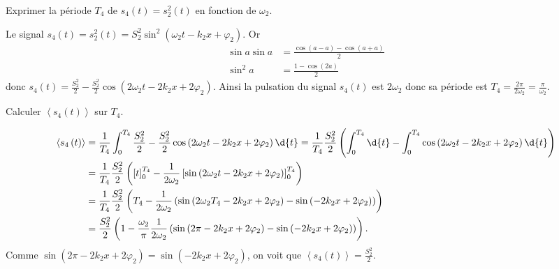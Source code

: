 
\begin{enonce}
	Exprimer la période $T_4$ de $s_4(t) = s_2^2(t)$ en fonction de $\omega_2$.
	\end{enonce}
	

\begin{corrige}
	Le signal $s_4(t) = s_2^2(t) = S^2_2 \sin^2\left( \omega_2 t - k_2 x + \varphi_2 \right)$. Or
	\begin{align*}
		\sin a \sin a &= \frac{\cos\left( a-a \right)-\cos\left( a+a \right) }{2}\\
		\sin^2 a &= \frac{1 - \cos\left( 2a \right) }{2}
	\end{align*}
	donc $s_4(t) = \frac{S^2_2}{2} - \frac{S^2_2}{2} \cos \left( 2\omega_2 t - 2k_2 x + 2\varphi_2 \right)  $.
	Ainsi la pulsation du signal $s_4(t)$ est $2\omega_2$ donc sa période est $T_4 = \frac{2\pi}{2\omega_2} = \frac{\pi}{\omega_2}$.
\end{corrige}




\begin{enonce}
	Calculer $\left< s_4\left( t \right) \right>$ sur $T_4$.
\end{enonce}
		
			
\begin{corrige}
	\begin{align*}
	\left< s_4\left( t \right) \right> &= \frac{1}{T_4} \int_0^{T_4} \frac{S^2_2}{2} - \frac{S^2_2}{2} \cos \left( 2\omega_2 t - 2k_2 x + 2\varphi_2 \right) \d{t}
	= \frac{1}{T_4} \frac{S^2_2}{2} \left( \int_0^{T_4} \d{t} - \int_0^{T_4} \cos \left( 2\omega_2 t - 2k_2 x + 2\varphi_2 \right) \d{t} \right)\\
	&= \frac{1}{T_4}\frac{S^2_2}{2} \left( \left[t\right]^{T_4}_0 - \frac{1}{2\omega_2}\left[ \sin\left( 2\omega_2 t - 2k_2 x + 2\varphi_2 \right) \right]^{T_4}_0 \right)\\
	&= \frac{1}{T_4}\frac{S^2_2}{2} \left( T_4 - \frac{1}{2\omega_2} \left( \sin\left( 2\omega_2 T_4 - 2k_2 x + 2\varphi_2 \right) - \sin\left( - 2k_2 x + 2\varphi_2 \right) \right) \right)\\
	&= \frac{S^2_2}{2} \left(  1 -  \frac{\omega_2}{\pi}\frac{1}{2\omega_2} \left( \sin\left( 2\pi - 2k_2 x + 2\varphi_2 \right) - \sin\left( - 2k_2 x + 2\varphi_2 \right) \right) \right).
	\end{align*}
	Comme $ \sin\left( 2\pi -2k_2 x + 2\varphi_2 \right) =  \sin\left( -2k_2 x + 2\varphi_2 \right)$, on voit que $\left< s_4\left( t \right) \right>=\frac{S^2_2}{2}$.
\end{corrige}

